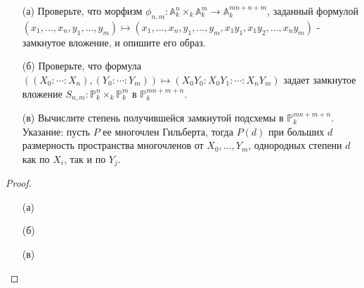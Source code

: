 \begin{prob}
\begin{itemize}
\item[]
\item[(а)] Проверьте, что морфизм $\phi_{n, m}: \mathbb{A}_k^n \times_k \mathbb{A}_k^m \rightarrow \mathbb{A}_k^{m n+n+m}$, заданный формулой $\left(x_1, \ldots, x_n, y_1, \ldots, y_m\right) \mapsto\left(x_1, \ldots, x_n, y_1, \ldots, y_m, x_1 y_1, x_1 y_2, \ldots, x_n y_m\right) $ - замкнутое вложение, и опишите его образ.
\item[(б)] Проверьте, что формула $\left(\left(X_0: \cdots: X_n\right),\left(Y_0: \cdots: Y_m\right)\right) \mapsto\left(X_0 Y_0: X_0 Y_1: \cdots: X_n Y_m\right)$ задает замкнутое вложение $S_{n, m}: \mathbb{P}_k^n \times_k \mathbb{P}_k^m$ в $\mathbb{P}_k^{m n+m+n}$.
\item[(в)] Вычислите степень получившейся замкнутой подсхемы в $\mathbb{P}_k^{m n+m+n}$. Указание: пусть $P$ ее многочлен Гильберта, тогда $P(d)$ при больших $d$ размерность пространства многочленов от $X_0, \ldots, Y_m$, однородных степени $d$ как по $X_i$, так и по $Y_j$.
\end{itemize}
\end{prob}
\begin{proof}
\begin{itemize}
\item[]
\item[(а)] 
\item[(б)] 
\item[(в)] 
\end{itemize}
\end{proof}
\begin{comment}

\end{comment}